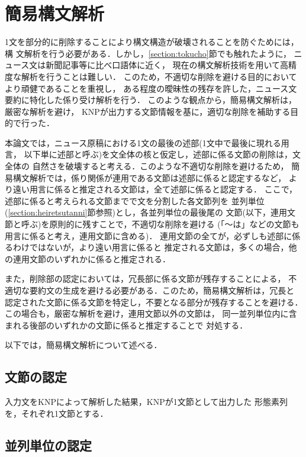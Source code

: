\section{簡易構文解析}
\label{section:kannikoubunkaiseki}

1文を部分的に削除することにより構文構造が破壊されることを防ぐためには，構
文解析を行う必要がある．しかし，\ref{section:tokucho}節でも触れたように，
ニュース文は新聞記事等に比べ口語体に近く，
現在の構文解析技術を用いて高精度な解析を行うことは難しい．
\label{part:001}
このため，不適切な削除を避ける目的においてより頑健であることを重視し，
ある程度の曖昧性の残存を許した，ニュース文要約に特化した係り受け解析を行う．
このような観点から，簡易構文解析は，厳密な解析を避け，
KNPが出力する文節情報を基に，適切な削除を補助する目的で行った．

本論文では，ニュース原稿における1文の最後の述部(1文中で最後に現れる用言，
以下単に述部と呼ぶ)を文全体の核と仮定し，述部に係る文節の削除は，文全体の
自然さを破壊すると考える．このような不適切な削除を避けるため，
簡易構文解析では，係り関係が連用である文節は述部に係ると認定するなど，
より遠い用言に係ると推定される文節は，全て述部に係ると認定する．
ここで，述部に係ると考えられる文節までで文を分割した各文節列を
並列単位(\ref{section:heiretsutanni}節参照)とし，各並列単位の最後尾の
文節(以下，連用文節と呼ぶ)を原則的に残すことで，不適切な削除を避ける
(「〜は」などの文節も用言に係ると考え，連用文節に含める)．
連用文節の全てが，必ずしも述部に係るわけではないが，より遠い用言に係ると
推定される文節は，多くの場合，他の連用文節のいずれかに係ると推定される．

また，削除部の認定においては，冗長部に係る文節が残存することによる，
不適切な要約文の生成を避ける必要がある．このため，簡易構文解析は，冗長と
認定された文節に係る文節を特定し，不要となる部分が残存することを避ける．
この場合も，厳密な解析を避け，連用文節以外の文節は，
同一並列単位内に含まれる後部のいずれかの文節に係ると推定することで
対処する．

以下では，簡易構文解析について述べる．

\subsection{文節の認定}

入力文をKNPによって解析した結果，KNPが1文節として出力した
形態素列を，それぞれ1文節とする．

\subsection{並列単位の認定}
\label{section:kakarisaki}
\label{section:heiretsutanni}

